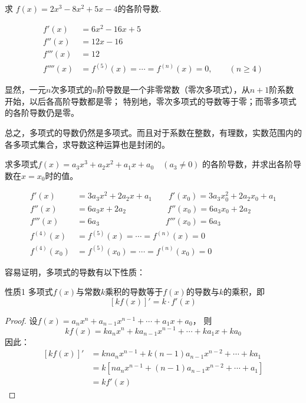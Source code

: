    \begin{example}
    求 $f(x)=2x^3-8x^2+5x-4$的各阶导数.
    \end{example}

    \begin{solution}
\[\begin{split}
    f' (x) &=6x^2-16x+5\\
        f'' (x) &=12x-16\\
        f''' (x) &=12\\
        f'''' (x) &=f^{(5)}(x)=\cdots =f^{(n)}(x)=0,\qquad (n\ge 4)
\end{split}\]
    \end{solution}    

    显然，一元$n$次多项式的$n$阶导数是一个非零常数（零次多项式），从$n+1$阶系数开始，以后各高阶导数都是零；
    特别地，零次多项式的导数等于零；而零多项式的各阶导数仍是零。

    总之，多项式的导数仍然是多项式。而且对于系数在整数，有理数，实数范围内的各多项式集合，求导数这种运算也是封闭的。

 
    \begin{example}
求多项式$f (x) =a_3x^3+a_2x^2+a_1x+a_0\quad  (a_3\ne 0)$ 的各阶导数，并求出各阶导数在$x=x_0$时的值。          
    \end{example}           
         
    \begin{solution}
\[\begin{split}
 f'(x)&=3a_3x^2+2a_2x+a_1\qquad 
    f' (x_0) =3a_3 x^2_0 +2a_2x_0+a_1\\
    f'' (x) &=6a_3x+2a_2\qquad \qquad \quad 
    f'' (x_0) =6a_3x_0+2a_2\\
    f''' (x) &=6a_3\qquad \qquad \qquad \qquad 
     f''' (x_0 ) =6a_3\\
     f^{(4)} (x)&=f^{(5)}(x)=\cdots =f^{(n)}(x)=0\\
     f^{(4)}  (x_0)&=f^{(5)}(x_0)=\cdots =f^{(n)}(x_0)=0 
\end{split}\] 
    \end{solution} 

容易证明，多项式的导数有以下性质：

\begin{blk}{性质1}
    多项式$f(x)$与常数$k$乘积的导数等于$f(x)$的导数与$k$的乘积，即
\[[kf (x) ]'=k\cdot f' (x) \]
\end{blk}   

\begin{proof}
设$f(x)=a_nx^n+a_{n-1}x^{n-1}+\cdots+a_1x+a_0$，
则
\[kf(x)=ka_nx^n+ka_{n-1}x^{n-1}+\cdots+ka_1x+ka_0\]
因此：
\[\begin{split}
    [kf(x)]'&=kna_nx^{n-1}+k(n - 1)a_{n-1}x^{n-2}+\cdots+ka_1\\
&=k \left[na_nx^{n-1}+(n - 1)a_{n-1}x^{n-2}+\cdots+a_1\right]\\
&=kf' (x) 
\end{split}\]
\end{proof}

